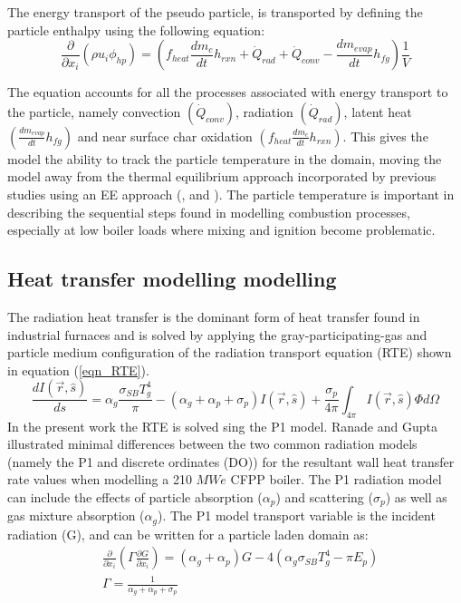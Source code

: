 \documentclass[review]{elsarticle}
\begin{document}
The energy transport of the pseudo particle, is transported by defining the particle enthalpy using the following equation:
\begin{equation}\label{eqn_phi_hp}
\frac{\partial}{\partial x_{i}}(\rho u_{i} \phi_{hp})=\left(f_{heat}\frac{dm_{c}}{dt}h_{rxn} + \dot{Q}_{rad} + \dot{Q}_{conv} - \frac{dm_{evap}}{dt}h_{fg}\right)\frac{1}{V}
\end{equation}

The equation accounts for all the processes associated with energy transport to the particle, namely convection $\left(\dot{Q}_{conv}\right)$, radiation $\left(\dot{Q}_{rad}\right)$, latent heat $\left(\frac{dm_{evap}}{dt}h_{fg}\right)$ and near surface char oxidation $\left(f_{heat}\frac{dm_{c}}{dt}h_{rxn}\right)$. This gives the model the ability to track the particle temperature in the domain, moving the model away from the thermal equilibrium approach incorporated by previous studies using an EE approach (\cite{Benim2005}, \cite{Vicente2003} and \cite{Cai2015}). The particle temperature is important in describing the sequential steps found in modelling combustion processes, especially at low boiler loads where mixing and ignition become problematic.

\subsection{Heat transfer modelling modelling}
The radiation heat transfer is the dominant form of heat transfer found in industrial furnaces \citep{Basu2000} and is solved by applying the gray-participating-gas and particle medium configuration of the radiation transport equation (RTE) \cite{Modest2013} shown in equation (\ref{eqn_RTE}).
\begin{equation}\label{eqn_RTE}
\frac{d I(\vec{r},\hat{s})}{ds} = \alpha_g \frac{\sigma_{SB} T_{g}^4}{\pi}-(\alpha_g+\alpha_p+\sigma_p)I(\vec{r},\hat{s}) + \frac{\sigma_p}{4\pi}\int_{4\pi}I(\vec{r},\hat{s})\Phi d \Omega
\end{equation}
In the present work the RTE is solved sing the P1 model. Ranade and Gupta \cite{Ranade2015} illustrated minimal differences between the two common radiation models (namely the P1 and discrete ordinates (DO)) for the resultant wall heat transfer rate values when modelling a 210 $MWe$ CFPP boiler. The P1 radiation model can include the effects of particle absorption ($\alpha_p$) and scattering ($\sigma_p$) as well as gas mixture absorption ($\alpha_g$). The P1 model transport variable is the incident radiation (G), and can be written for a particle laden domain as:
\begin{equation}
\begin{split}
&\frac{\partial}{\partial x_{i}}\left(\Gamma\frac{\partial G}{\partial x_{i}}\right)=\left(\alpha_g+\alpha_p\right)G-4\left(\alpha_g \sigma_{SB} T_{g}^4-\pi E_p \right)\\
&\Gamma = \frac{1}{\alpha_g+\alpha_p+\sigma_p}
\end{split}
\end{equation}
\end{document}

